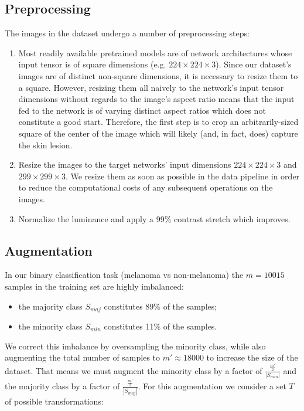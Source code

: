 \subsection{Preprocessing}
\label{subsection:preprocessing}

The images in the dataset undergo a number of preprocessing steps:

\begin{enumerate}
    \item Most readily available pretrained models are of network architectures whose input tensor is of square dimensions (e.g. $224 \times 224 \times 3$). Since our dataset's images are of distinct non-square dimensions, it is necessary to resize them to a square. However, resizing them all naively to the network's input tensor dimensions without regards to the image's aspect ratio means that the input fed to the network is of varying distinct aspect ratios which does not constitute a good start. Therefore, the first step is to crop an arbitrarily-sized square of the center of the image which will likely (and, in fact, does) capture the skin lesion.
    \item Resize the images to the target networks' input dimensions $224 \times 224 \times 3$ and $299 \times 299 \times 3$. We resize them as soon as possible in the data pipeline in order to reduce the computational costs of any subsequent operations on the images.
    \item Normalize the luminance and apply a 99\% contrast stretch which improves.
\end{enumerate}

\subsection{Augmentation}
\label{subsection:augmentation}

In our binary classification task (melanoma vs non-melanoma) the $m = 10015$ samples in the training set are highly imbalanced:

\begin{itemize}
    \item the majority class $S_{maj}$ constitutes 89\% of the samples;
    \item the minority class $S_{min}$ constitutes 11\% of the samples.
\end{itemize}

We correct this imbalance by oversampling the minority class, while also augmenting the total number of samples to $m' \approx 18000$ to increase the size of the dataset. That means we must augment the minority class by a factor of $\frac{\frac{m'}{2}}{|S_{min}|}$ and the majority class by a factor of $\frac{\frac{m'}{2}}{|S_{maj}|}$. For this augmentation we consider a set $T$ of possible transformations:

